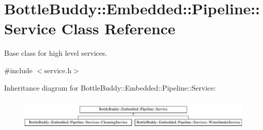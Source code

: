 \hypertarget{class_bottle_buddy_1_1_embedded_1_1_pipeline_1_1_service}{}\section{Bottle\+Buddy\+:\+:Embedded\+:\+:Pipeline\+:\+:Service Class Reference}
\label{class_bottle_buddy_1_1_embedded_1_1_pipeline_1_1_service}


Base class for high level services.  




{\ttfamily \#include $<$service.\+h$>$}

Inheritance diagram for Bottle\+Buddy\+:\+:Embedded\+:\+:Pipeline\+:\+:Service\+:\begin{figure}[H]
\begin{center}
\leavevmode
\includegraphics[height=1.493333cm]{class_bottle_buddy_1_1_embedded_1_1_pipeline_1_1_service}
\end{center}
\end{figure}
